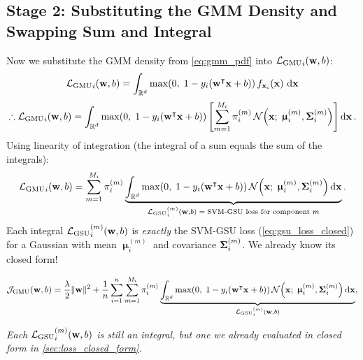 \documentclass[11pt, letterpaper]{article}
\newcommand{\bSigma}{\vb{\Sigma}}
\newcommand{\bmu}{\boldsymbol{\upmu}}
\newcommand{\R}{\mathbb{R}}
\newcommand{\loss}{\mathcal{L}}
\newcommand{\obj}{\mathcal{J}}
\newcommand{\Norm}{\mathcal{N}}
\begin{document}
\subsection{Stage 2: Substituting the GMM Density and Swapping Sum and Integral}

Now we substitute the GMM density from \cref{eq:gmm_pdf} into ${\loss_{\text{GMU}}}_{i}(\vb{w}, b)$:
\begin{equation*}
    {\loss_{\text{GMU}}}_{i}(\vb{w}, b) = \int_{\R^d} \max\!\left(0,\; 1 - y_i(\vb{w}^{\intercal}\vb{x}+b)\right) f_{\vb{x}_i}(\vb{x})\,\dd{\vb{x}}
\end{equation*}
\begin{equation}\label{eq:gmu_substitution}
    \therefore {\loss_{\text{GMU}}}_{i}(\vb{w}, b) = \int_{\R^d} \max\!\left(0,\; 1 - y_i(\vb{w}^{\intercal} \vb{x} + b)\right) \left[\sum_{m=1}^{M_i} \pi_i^{(m)}\, \Norm\!\left(\vb{x};\; \bmu_i^{(m)}, \bSigma_i^{(m)}\right)\right] \dd{\vb{x}}.
\end{equation}
Using linearity of integration (the integral of a sum equals the sum of the integrals):
\begin{equation}\label{eq:gmu_swap}
    {\loss_{\text{GMU}}}_{i}(\vb{w}, b) = \sum_{m=1}^{M_i} \pi_i^{(m)} \underbrace{\int_{\R^d} \max\!\left(0,\; 1 - y_i(\vb{w}^{\intercal} \vb{x} + b)\right) \Norm\!\left(\vb{x};\; \bmu_i^{(m)}, \bSigma_i^{(m)}\right) \dd{\vb{x}}}_{{\loss_{\text{GSU}}}_{i}^{(m)}(\vb{w}, b) \;=\; \text{SVM-GSU loss for component } m}.
\end{equation}
Each integral ${\loss_{\text{GSU}}}_{i}^{(m)}(\vb{w}, b)$ is \emph{exactly} the SVM-GSU loss (\cref{eq:gsu_loss_closed}) for a Gaussian with mean $\bmu_i^{(m)}$ and covariance $\bSigma_i^{(m)}$. We already know its closed form!

\begin{statusbox}
\vspace{-0.5em}
\begin{equation*}
    \obj_{\text{GMU}}(\vb{w}, b) = \frac{\lambda}{2}\|\vb{w}\|^2 + \frac{1}{n}\sum_{i=1}^{n}\sum_{m=1}^{M_i} \pi_i^{(m)} \underbrace{\int_{\R^d} \max\!\left(0,\; 1 - y_i(\vb{w}^{\intercal} \vb{x} + b)\right) \Norm\!\left(\vb{x};\; \bmu_i^{(m)}, \bSigma_i^{(m)}\right) \dd{\vb{x}}}_{{\loss_{\text{GSU}}}_{i}^{(m)}(\vb{w}, b)},
\end{equation*}
\vspace{-1em}
\begin{center}\small
\emph{Each ${\loss_{\text{GSU}}}_{i}^{(m)}(\vb{w}, b)$ is still an integral, but one we already evaluated in closed form in \cref{sec:loss_closed_form}.}
\end{center}
\end{statusbox}
\end{document}
